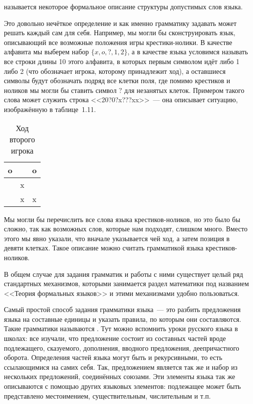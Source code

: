 \begin{definition}
 называется некоторое формальное описание структуры допустимых слов языка.
\end{definition}

Это довольно нечёткое определение и как именно грамматику задавать может решать каждый сам для себя. Например, мы могли бы сконструировать язык, описывающий все возможные положения игры крестики-нолики. В качестве алфавита мы выберем набор $\{x, o, ?,1, 2\}$, а в качестве языка условимся называть все строки длины 10 этого алфавита, в которых первым символом идёт либо 1 либо 2 (что обозначает игрока, которому принадлежит ход), а оставшиеся символы будут обозначать подряд все клетки поля, где помимо крестиков и ноликов мы могли бы ставить символ $?$ для незанятых клеток. Примером такого слова может служить строка <<20?0?x???xx>>~--- она описывает ситуацию, изображённую в таблице~1.11.

\begin{table}[h]
\centering
\begin{tabular}{c | c | c}
o & & o\\
\hline
  & x & \\
\hline
 & x & x
\end{tabular}
\caption{Ход второго игрока}
\end{table}

Мы могли бы перечислить все слова языка крестиков-ноликов, но это было бы сложно, так как возможных слов, которые нам подходят, слишком много. Вместо этого мы явно указали, что вначале указывается чей ход, а затем позиция в девяти клетках. Такое описание можно считать грамматикой языка крестиков-ноликов.

В общем случае для задания грамматик и работы с ними существует целый ряд стандартных механизмов, которыми занимается раздел математики под названием <<Теория формальных языков>> и этими механизмами удобно пользоваться.

Самый простой способ задания грамматики языка~--- это разбить предложения языка на составные единицы и указать правила, по которым они составляются. Такие грамматики называются . Тут можно вспомнить уроки русского языка в школах: все изучали, что предложение состоит из составных частей вроде подлежащего, сказуемого, дополнения, вводного предложения, деепричастного оборота. Определения частей языка могут быть и рекурсивными, то есть ссылающимися на самих себя. Так, предложением является так же и набор из нескольких предложений, соединённых союзами. Эти элементы языка так же описываются с помощью других языковых элементов: подлежащее может быть представлено местоимением, существительным, числительным и т.п.

